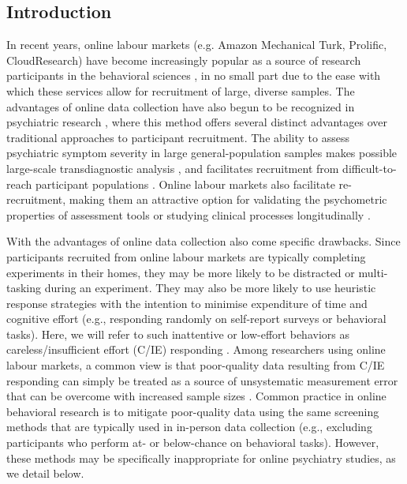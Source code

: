 \documentclass[a4paper,notitlepage,12pt]{article}
\begin{document}
\begin{refsection}[main]
\section{Introduction}

In recent years, online labour markets (e.g. Amazon Mechanical Turk, Prolific, CloudResearch) have become increasingly popular as a source of research participants in the behavioral sciences \cite{stewart2017crowdsourcing}, in no small part due to the ease with which these services allow for recruitment of large, diverse samples. The advantages of online data collection have also begun to be recognized in psychiatric research \cite{chandler2016conducting}, where this method offers several distinct advantages over traditional approaches to participant recruitment. The ability to assess psychiatric symptom severity in large general-population samples makes possible large-scale transdiagnostic analysis \cite{gillan2016taking, rutledge2019machine}, and facilitates recruitment from difficult-to-reach participant populations \cite{strickland2019use}. Online labour markets also facilitate re-recruitment, making them an attractive option for validating the psychometric properties of assessment tools \cite{enkavi2019large} or studying clinical processes longitudinally \cite{kothe2019retention}.

With the advantages of online data collection also come specific drawbacks. Since participants recruited from online labour markets are typically completing experiments in their homes, they may be more likely to be distracted or multi-tasking during an experiment. They may also be more likely to use heuristic response strategies with the intention to minimise expenditure of time and cognitive effort (e.g., responding randomly on self-report surveys or behavioral tasks). Here, we will refer to such inattentive or low-effort behaviors as careless/insufficient effort (C/IE) responding \cite{huang2012detecting, curran2016methods}. Among researchers using online labour markets, a common view is that poor-quality data resulting from C/IE responding can simply be treated as a source of unsystematic measurement error that can be overcome with increased sample sizes \cite{gillan2016taking, chandler2020participant}. Common practice in online behavioral research is to mitigate poor-quality data using the same screening methods that are typically used in in-person data collection (e.g., excluding participants who perform at- or below-chance on behavioral tasks). However, these methods may be specifically inappropriate for online psychiatry studies, as we detail below.


\end{refsection}
\end{document}
